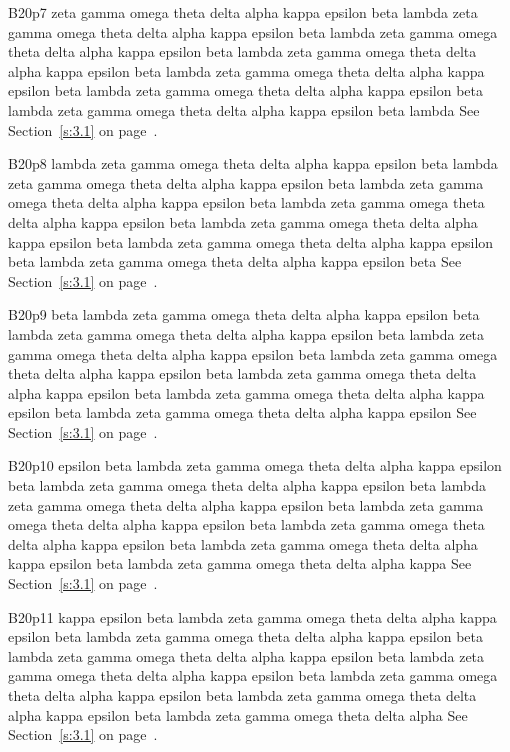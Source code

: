 B20p7 zeta gamma omega theta delta alpha kappa epsilon beta lambda zeta gamma omega theta delta alpha kappa epsilon beta lambda zeta gamma omega theta delta alpha kappa epsilon beta lambda zeta gamma omega theta delta alpha kappa epsilon beta lambda zeta gamma omega theta delta alpha kappa epsilon beta lambda zeta gamma omega theta delta alpha kappa epsilon beta lambda zeta gamma omega theta delta alpha kappa epsilon beta lambda See Section~\ref{s:3.1} on page~\pageref{s:3.1}.

B20p8 lambda zeta gamma omega theta delta alpha kappa epsilon beta lambda zeta gamma omega theta delta alpha kappa epsilon beta lambda zeta gamma omega theta delta alpha kappa epsilon beta lambda zeta gamma omega theta delta alpha kappa epsilon beta lambda zeta gamma omega theta delta alpha kappa epsilon beta lambda zeta gamma omega theta delta alpha kappa epsilon beta lambda zeta gamma omega theta delta alpha kappa epsilon beta See Section~\ref{s:3.1} on page~\pageref{s:3.1}.

B20p9 beta lambda zeta gamma omega theta delta alpha kappa epsilon beta lambda zeta gamma omega theta delta alpha kappa epsilon beta lambda zeta gamma omega theta delta alpha kappa epsilon beta lambda zeta gamma omega theta delta alpha kappa epsilon beta lambda zeta gamma omega theta delta alpha kappa epsilon beta lambda zeta gamma omega theta delta alpha kappa epsilon beta lambda zeta gamma omega theta delta alpha kappa epsilon See Section~\ref{s:3.1} on page~\pageref{s:3.1}.

B20p10 epsilon beta lambda zeta gamma omega theta delta alpha kappa epsilon beta lambda zeta gamma omega theta delta alpha kappa epsilon beta lambda zeta gamma omega theta delta alpha kappa epsilon beta lambda zeta gamma omega theta delta alpha kappa epsilon beta lambda zeta gamma omega theta delta alpha kappa epsilon beta lambda zeta gamma omega theta delta alpha kappa epsilon beta lambda zeta gamma omega theta delta alpha kappa See Section~\ref{s:3.1} on page~\pageref{s:3.1}.

B20p11 kappa epsilon beta lambda zeta gamma omega theta delta alpha kappa epsilon beta lambda zeta gamma omega theta delta alpha kappa epsilon beta lambda zeta gamma omega theta delta alpha kappa epsilon beta lambda zeta gamma omega theta delta alpha kappa epsilon beta lambda zeta gamma omega theta delta alpha kappa epsilon beta lambda zeta gamma omega theta delta alpha kappa epsilon beta lambda zeta gamma omega theta delta alpha See Section~\ref{s:3.1} on page~\pageref{s:3.1}.

